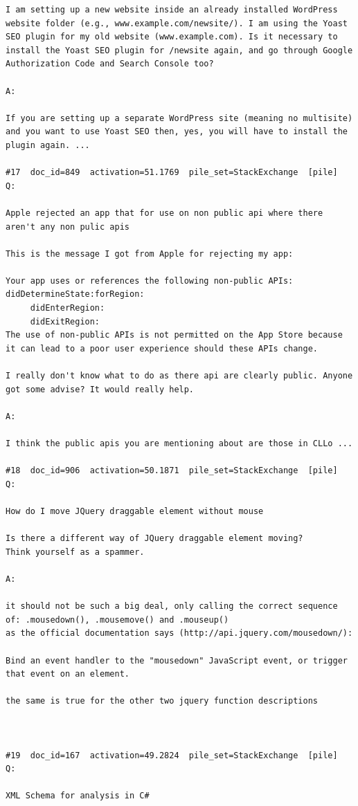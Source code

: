 \begin{verbatim}
I am setting up a new website inside an already installed WordPress website folder (e.g., www.example.com/newsite/). I am using the Yoast SEO plugin for my old website (www.example.com). Is it necessary to install the Yoast SEO plugin for /newsite again, and go through Google Authorization Code and Search Console too?

A:

If you are setting up a separate WordPress site (meaning no multisite) and you want to use Yoast SEO then, yes, you will have to install the plugin again. ...

#17  doc_id=849  activation=51.1769  pile_set=StackExchange  [pile]
Q:

Apple rejected an app that for use on non public api where there aren't any non pulic apis

This is the message I got from Apple for rejecting my app:

Your app uses or references the following non-public APIs:
didDetermineState:forRegion:
     didEnterRegion:
     didExitRegion:
The use of non-public APIs is not permitted on the App Store because it can lead to a poor user experience should these APIs change.

I really don't know what to do as there api are clearly public. Anyone got some advise? It would really help.

A:

I think the public apis you are mentioning about are those in CLLo ...

#18  doc_id=906  activation=50.1871  pile_set=StackExchange  [pile]
Q:

How do I move JQuery draggable element without mouse

Is there a different way of JQuery draggable element moving?
Think yourself as a spammer.

A:

it should not be such a big deal, only calling the correct sequence of: .mousedown(), .mousemove() and .mouseup()
as the official documentation says (http://api.jquery.com/mousedown/):

Bind an event handler to the "mousedown" JavaScript event, or trigger that event on an element.

the same is true for the other two jquery function descriptions



#19  doc_id=167  activation=49.2824  pile_set=StackExchange  [pile]
Q:

XML Schema for analysis in C#


\end{verbatim}
